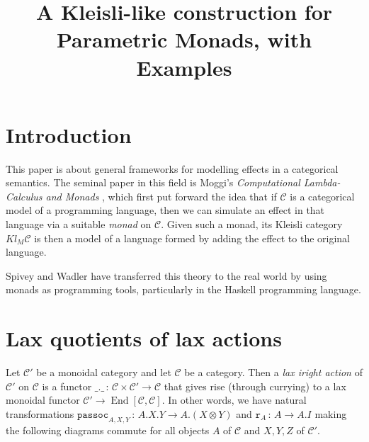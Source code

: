\documentclass{svproc}
\newcommand\C{\mathcal{C}}
\newcommand\from{\,\colon\,}
\DeclareMathOperator{\End}{End}
\newcommand{\passoc}{\texttt{passoc}}
\newcommand\tensor\otimes
\newcommand\run{\texttt{r}}
\begin{document}
\mainmatter              %
%
\title{A Kleisli-like construction for Parametric Monads, with Examples}
%
%
\author{}
%
\authorrunning{} %
%
\tocauthor{}
%

\maketitle              %

\begin{abstract}
\end{abstract}

\section{Introduction}

This paper is about general frameworks for modelling effects in a categorical semantics.  
The seminal paper in this field is Moggi's \emph{Computational Lambda-Calculus and Monads} \cite{Moggi}, which first put forward the idea that if $\C$ is a categorical model of a programming language, then we can simulate an effect in that language via a suitable \emph{monad} on $\C$.  
Given such a monad, its Kleisli category $Kl_M\C$ is then a model of a language formed by adding the effect to the original language.  

Spivey \cite{Spivey} and Wadler \cite{Wadler1,Wadler2} have transferred this theory to the real world by using monads as programming tools, particularly in the Haskell programming language.  



\section{Lax quotients of lax actions}

Let $\C'$ be a monoidal category and let $\C$ be a category.  
Then a \emph{lax iright action} of $\C'$ on $\C$ is a functor $\_.\_\from \C\times\C'\to \C$ that gives rise (through currying) to a lax monoidal functor $\C'\to \End[\C,\C]$.  
In other words, we have natural transformations $\passoc_{A,X,Y}\from A.X.Y\to A.(X\tensor Y)$ and $\run_A\from A \to A.I$ making the following diagrams commute for all objects $A$ of $\C$ and $X,Y,Z$ of $\C'$.
\end{document}
